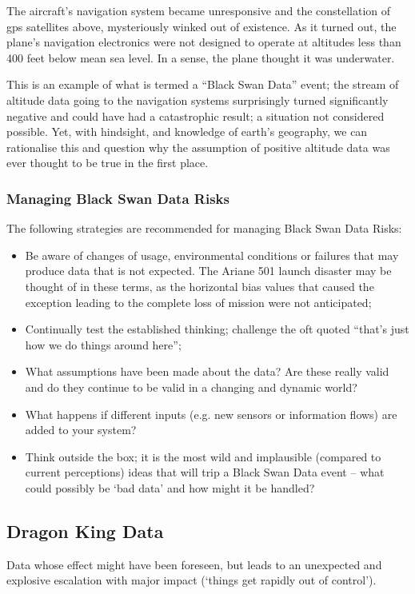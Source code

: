 The aircraft's navigation system became unresponsive and the constellation of \gls{gps} satellites above, mysteriously winked out of existence. As it turned out, the plane's navigation electronics were not designed to operate at altitudes less than 400 feet below mean sea level. In a sense, the plane thought it was underwater.

This is an example of what is termed a “Black Swan Data” event; the stream of altitude data going to the navigation systems surprisingly turned significantly negative and could have had a catastrophic result; a situation not considered possible. Yet, with hindsight, and knowledge of earth’s geography, we can rationalise this and question why the assumption of positive altitude data was ever thought to be true in the first place.

\subsubsection{Managing Black Swan Data Risks}
The following strategies are recommended for managing Black Swan Data Risks:
\begin{itemize}
\item Be aware of changes of usage, environmental conditions or failures that may produce data
that is not expected.
The Ariane 501 launch disaster may be thought of in these terms,
as the horizontal bias values that caused the exception leading to the complete loss of mission
were not anticipated;
\item Continually test the established thinking; challenge the oft quoted
“that’s just how we do things around here”;
\item What assumptions have been made about the data?
Are these really valid and do they continue to be valid in a changing and dynamic world?
\item What happens if different inputs (e.g. new sensors or \gls{information} flows)
are added to your system?
\item Think outside the box;
it is the most wild and implausible (compared to current perceptions)
ideas that will trip a Black Swan Data event --
what could possibly be ‘bad data’ and how might it be handled?
\end{itemize}

\subsection{Dragon King Data}
 Data whose effect might have been foreseen, but leads to an unexpected and explosive escalation
with major impact (‘things get rapidly out of control’).

